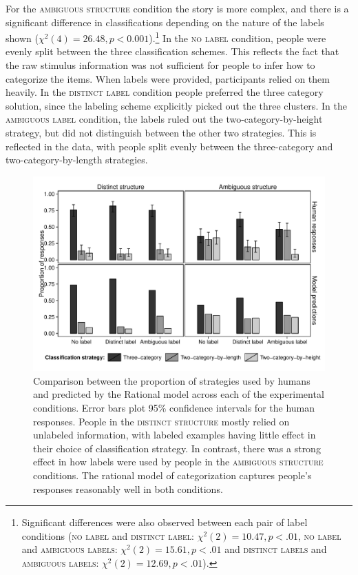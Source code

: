 \documentclass[a4paper, doc]{apa6}
\begin{document}
For the \textsc{ambiguous structure} condition the story is more complex, and there is a significant difference in classifications depending on the nature of the labels shown (\(\chi^2(4) = 26.48, p < 0.001\)).\footnote{Significant differences were also observed between each pair of label conditions (\textsc{no label} and \textsc{distinct label}: \(\chi^2(2) = 10.47, p < .01\), \textsc{no label} and \textsc{ambiguous labels}: \(\chi^2(2) = 15.61, p < .01\) and \textsc{distinct labels} and \textsc{ambiguous labels}: \(\chi^2(2) = 12.69, p < .01\)).} In the \textsc{no label} condition, people were evenly split between the three classification schemes. This reflects the fact that the raw stimulus information was not sufficient for people to infer how to categorize the items. When labels were provided, participants relied on them heavily. In the \textsc{distinct label} condition people preferred the three category solution, since the labeling scheme explicitly picked out the three clusters. In the \textsc{ambiguous label} condition, the labels ruled out the two-category-by-height strategy, but did not distinguish between the other two strategies. This is reflected in the data, with people split evenly between the three-category and two-category-by-length strategies.


\begin{figure}[t]
  \begin{center}
    \includegraphics[width=1\textwidth]{figures/human-model-strategies.pdf}
    \caption{Comparison between the proportion of strategies used by humans and predicted by the Rational model across each of the experimental conditions. Error bars plot 95\% confidence intervals for the human responses. People in the \textsc{distinct structure} mostly relied on unlabeled information, with labeled examples having little effect in their choice of classification strategy. In contrast, there was a strong effect in how labels were used by people in the \textsc{ambiguous structure} conditions. The rational model of categorization captures people's responses reasonably well in both conditions.}
    \label{strategy-histogram}
  \end{center}
\end{figure}
\end{document}
